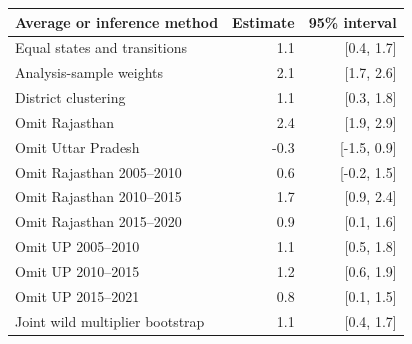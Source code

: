 \begin{tabular}{lrr}
\toprule
Average or inference method & Estimate & 95\% interval \\
\midrule
Equal states and transitions & 1.1 & [0.4, 1.7] \\
Analysis-sample weights & 2.1 & [1.7, 2.6] \\
District clustering & 1.1 & [0.3, 1.8] \\
Omit Rajasthan & 2.4 & [1.9, 2.9] \\
Omit Uttar Pradesh & -0.3 & [-1.5, 0.9] \\
Omit Rajasthan 2005--2010 & 0.6 & [-0.2, 1.5] \\
Omit Rajasthan 2010--2015 & 1.7 & [0.9, 2.4] \\
Omit Rajasthan 2015--2020 & 0.9 & [0.1, 1.6] \\
Omit UP 2005--2010 & 1.1 & [0.5, 1.8] \\
Omit UP 2010--2015 & 1.2 & [0.6, 1.9] \\
Omit UP 2015--2021 & 0.8 & [0.1, 1.5] \\
Joint wild multiplier bootstrap & 1.1 & [0.4, 1.7] \\
\bottomrule
\end{tabular}
